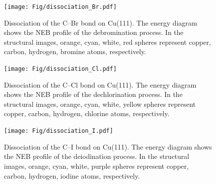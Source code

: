 \documentclass[journal=jpclcd,layout=traditional,manuscript=letter]{achemso} %
\newcommand{\sinfo}{Supporting Information}
\begin{document}
\begin{figure}[b]
\centering
\texttt{[image: Fig/dissociation\_Br.pdf]}
\caption{Dissociation of the C--Br bond on Cu(111). The energy diagram shows the NEB profile of the debromination process. In the structural images, orange, cyan, white, red spheres represent copper, carbon, hydrogen, bromine atoms, respectively.} %
\label{fig:dissociation_Br}
\end{figure}

\begin{figure}[hbt]
\centering
\texttt{[image: Fig/dissociation\_Cl.pdf]}
\caption{Dissociation of the C--Cl bond on Cu(111). The energy diagram shows the NEB profile of the dechlorination process. In the structural images, orange, cyan, white, yellow spheres represent copper, carbon, hydrogen, chlorine atoms, respectively.}
\label{fig:dissociation_Cl}
\end{figure}

\begin{figure}[hbt]
\centering
\texttt{[image: Fig/dissociation\_I.pdf]}
\caption{Dissociation of the C--I bond on Cu(111). The energy diagram shows the NEB profile of the deiodination process. In the structural images, orange, cyan, white, purple spheres represent copper, carbon, hydrogen, iodine atoms, respectively.}
\label{fig:dissociation_I}
\end{figure}

\end{document}
